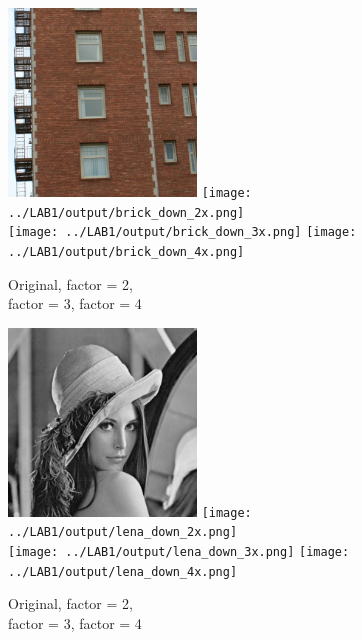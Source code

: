 \begin{figure}[h!]
    \centering
    \includegraphics[width=5cm]{../LAB1/img/bricks.png}
    \texttt{[image: ../LAB1/output/brick\_down\_2x.png]} \\
    \texttt{[image: ../LAB1/output/brick\_down\_3x.png]}
    \texttt{[image: ../LAB1/output/brick\_down\_4x.png]}
    \caption{Original, factor = 2,\\ factor = 3, factor = 4}
\end{figure}


\begin{figure}[h!]
    \centering
    \includegraphics[width=5cm]{../LAB1/img/lena.png}
    \texttt{[image: ../LAB1/output/lena\_down\_2x.png]} \\
    \texttt{[image: ../LAB1/output/lena\_down\_3x.png]}
    \texttt{[image: ../LAB1/output/lena\_down\_4x.png]}
    \caption{Original, factor = 2,\\ factor = 3, factor = 4}
\end{figure}